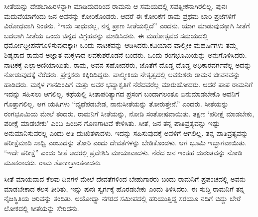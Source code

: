 ಸೀತೆಯನ್ನು ದೇಶಬಾಹಿರಳನ್ನಾಗಿ ಮಾಡಿದುದರಿಂದ ರಾಮನು ಆ ಸಮಯದಲ್ಲಿ ಸಪತ್ನೀಕನಾಗಿರಲಿಲ್ಲ. ಪುನಃ ಮದುವೆಯಾಗೆಂದು ಜನ ಅವನನ್ನು ಕೋರಿಕೊಂಡರು. ಆದರೆ ಈ ಕೋರಿಕೆಗೆ ರಾಮ ಪ್ರಥಮ ಬಾರಿ ಪ್ರಜೆಗಳಿಗೆ ವಿರೋಧವಾಗಿ ನಿಂತನು. “ಇದು ಸಾಧುವಲ್ಲ, ನನ್ನ ಪ್ರಾಣ ಸೀತೆಯಲ್ಲಿದೆ” ಎಂದನು. ಯಾಗ ಮಾಡುವುದಕ್ಕಾಗಿ ಸೀತೆಗೆ ಬದಲಾಗಿ ಸೀತೆಯ ಒಂದು ಚಿನ್ನದ ವಿಗ್ರಹವನ್ನು ಮಾಡಿಸಿದನು. ಈ ಮಹೋತ್ಸವದ ಸಮಯದಲ್ಲಿ ಧರ್ಮೋದ್ದೀಪನೆಗೊಳಿಸುವುದಕ್ಕಾಗಿ ಒಂದು ನಾಟಕವನ್ನು ಆಡಿಸಿದರು.\break ಕವಿಯಾದ ವಾಲ್ಮೀಕಿ ಮಹರ್ಷಿಗಳು ತಮ್ಮ ಶಿಷ್ಯರಾದ ರಾಮನ ಅಜ್ಞಾತ ಮಕ್ಕಳಾದ ಲವಕುಶರೊಡನೆ ಬಂದರು. ಒಂದು ರಂಗಭೂಮಿಯನ್ನು ಅನುಗೊಳಿಸಿದರು. ನಾಟಕಕ್ಕೆ ಎಲ್ಲಾ\break ಅಣಿಯಾಯಿತು. ರಾಮ, ಅವನ ಸಹೋದರರು, ಜೊತೆಗೆ ದೊಡ್ಡ ದೊಡ್ಡ ಅಧಿಕಾರ\break ವರ್ಗವೆಲ್ಲ ಅದನ್ನು ನೋಡುವುದಕ್ಕೆ ನೆರೆದರು. ಪ್ರೇಕ್ಷಕರು ಕಿಕ್ಕಿರಿದಿದ್ದರು. ವಾಲ್ಮೀಕಿಯ ನೇತೃತ್ವದಲ್ಲಿ ಲವಕುಶರು ರಾಮನ ಜೀವನವನ್ನು ಹಾಡಿದರು. ಮಕ್ಕಳ ಗಾನದಿಂಪಿಗೆ ಮತ್ತು ಅವರ ಭವ್ಯಾಕೃತಿಗೆ ನೆರೆದವರೆಲ್ಲ ಮಾರುಹೋದರು. ಆದರೆ ಪಾಪ ರಾಮನಿಗೆ ಇದನ್ನು ಸಹಿಸಲು ಆಗಲಿಲ್ಲ. ಕಥೆಯಲ್ಲಿ ಸೀತಾಪರಿತ್ಯಾಗದ ಪ್ರಸಂಗ ಬಂದಾಗಲಂತೂ ಏನು\break ಮಾಡಬೇಕೊ ಅವನಿಗೆ ಗೊತ್ತಾಗಲಿಲ್ಲ. ಆಗ ಋಷಿಗಳು “ವ್ಯಥೆಪಡಬೇಡ, ನಾನು\break ಸೀತೆಯನ್ನು ತೋರುತ್ತೇನೆ.” ಎಂದರು. ಸೀತೆಯನ್ನು ರಂಗಭೂಮಿಯ ಮೇಲೆ ತಂದರು. ರಾಮನಿಗೆ ಸೀತೆಯನ್ನು, ನೋಡಿ ಸಂತೋಷವಾಯಿತು. ತಕ್ಷಣ ‘ಪರೀಕ್ಷೆ ಮಾಡಬೇಕು, ಪರೀಕ್ಷೆ ಮಾಡಬೇಕು’ ಎಂಬ ಹಿಂದಿನ ಗೊಣಗಾಟವೆ ಕೇಳಿಸಿತು. ಸೀತೆ, ಜನ ತನ್ನ ಪಾತಿವ್ರತ್ಯವನ್ನು ಇಷ್ಟು ಅನುಮಾನಿಸುವರಲ್ಲ ಎಂದು ಅತಿ ದುಃಖಿತಳಾದಳು. ಇದನ್ನು ಸಹಿಸುವುದಕ್ಕೆ ಅವಳಿಗೆ ಆಗಲಿಲ್ಲ. ತನ್ನ ಪಾತಿವ್ರತ್ಯವನ್ನು ಪರೀಕ್ಷೆಮಾಡಿ ಸಾಧ್ವಿ ಎಂಬುದನ್ನು ತೋರಿ ಎಂದು ದೇವತೆಗಳನ್ನು ಬೇಡಿಕೊಂಡಳು. ಆಗ ಭೂಮಿ ಇಬ್ಭಾಗವಾಯಿತು. “ಇದೇ ಪರೀಕ್ಷೆ” ಎಂದು ಸೀತೆ ಅದರಲ್ಲಿ ಪ್ರವೇಶಿಸಿ ಮಾಯಾವಾದಳು. ನೆರೆದ ಜನ ಇಂತಹ ದುರಂತವನ್ನು ನೋಡಿ ಮೂಕರಾದರು. ರಾಮ ಶೋಕಾಕ್ರಾಂತನಾದನು.

ಸೀತೆ ಮಾಯವಾದ ಕೆಲವು ದಿನಗಳ ಮೇಲೆ ದೇವತೆಗಳಿಂದ ಬೇಹುಗಾರರು ಬಂದು ರಾಮನಿಗೆ ಪ್ರಪಂಚದಲ್ಲಿ ಅವನು ಮಾಡಬೇಕಾದ ಕೆಲಸ ತೀರಿತು, ಇನ್ನು ಪುನಃ ಸ್ವರ್ಗಕ್ಕೆ ಹೊರಡಬೇಕು ಎಂದು ತಿಳಿಸಿದರು. ಈ ಸುದ್ದಿ ರಾಮನಿಗೆ ತನ್ನ ನೈಜಸ್ಥಿತಿಯ ಅರಿವನ್ನು ತಂದಿತು. ಅಯೋಧ್ಯಾ ನಗರದ ಸಮೀಪದಲ್ಲಿ ಹರಿಯುತ್ತಿದ್ದ ಸರಯೂ ನದಿಗೆ ಬಿದ್ದು ಬೇರೆ ಲೋಕದಲ್ಲಿ ಸೀತೆಯನ್ನು ಸೇರಿದನು.

